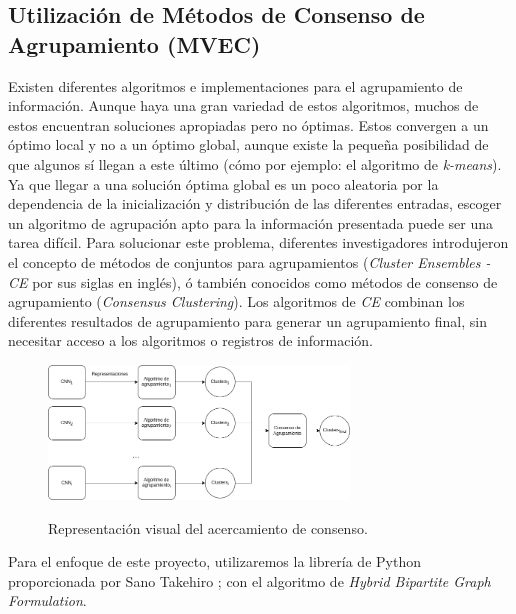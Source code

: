 \documentclass[letterpaper, 10 pt, conference]{ieeeconf}  %
\begin{document}

    \subsection{Utilización de Métodos de Consenso de Agrupamiento (MVEC)}
    Existen diferentes algoritmos e implementaciones para el agrupamiento de información. Aunque
    haya una gran variedad de estos algoritmos, muchos de estos encuentran soluciones apropiadas
    pero no óptimas. Estos convergen a un óptimo local y no a un óptimo global, aunque existe
    la pequeña posibilidad de que algunos sí llegan a este último (cómo por ejemplo: el algoritmo
    de \textit{k-means}). Ya que llegar a una solución óptima global es un poco aleatoria por la
    dependencia de la inicialización y distribución de las diferentes entradas, escoger un
    algoritmo de agrupación apto para la información presentada puede ser una tarea difícil. Para
    solucionar este problema, diferentes investigadores introdujeron el concepto de métodos de
    conjuntos para agrupamientos (\textit{Cluster Ensembles - CE} por sus siglas en inglés),
    ó también conocidos como métodos de consenso de agrupamiento (\textit{Consensus Clustering}).
    Los algoritmos de \textit{CE} combinan los diferentes resultados de agrupamiento para generar
    un agrupamiento final, sin necesitar acceso a los algoritmos o registros de información.
    \cite{Golalipour2021}

    \begin{figure}[ht]
        \centering
        \includegraphics[width=8cm]{./figs/mvec.png}
        \label{fig: MVEC}
        \caption{Representación visual del acercamiento de consenso.}
    \end{figure}


    Para el enfoque de este proyecto, utilizaremos la librería de Python proporcionada por Sano
    Takehiro \cite{Sano_ClusterEnsembles_2021}; con el algoritmo de \textit{Hybrid Bipartite Graph
    Formulation}. \cite{Fern2004}
\end{document}
